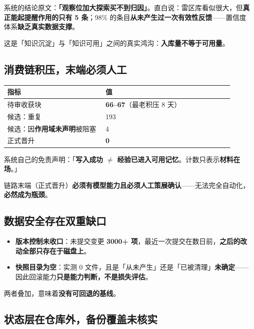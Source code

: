 \documentclass[11pt,a4paper]{ctexart}
\newcommand{\warnbox}[1]{%
  \begin{center}%
  \begin{minipage}{0.94\linewidth}%
  \setlength{\fboxsep}{9pt}%
  \colorbox{QuoteBg}{\parbox{\dimexpr\linewidth-2\fboxsep}{%
    \color{WarnRed}#1}}%
  \end{minipage}%
  \end{center}%
}
\begin{document}
系统的结论原文：\textbf{「观察位加大探索买不到归因」}。直白说：雷区库看似很大，但\textbf{真正能起提醒作用的只有 5 条}；98\% 的条目\textbf{从未产生过一次有效性反馈}——置信度体系\textbf{缺乏真实数据支撑}。

\warnbox{这是「知识沉淀」与「知识可用」之间的真实鸿沟：\textbf{入库量不等于可用量}。}

\subsection{消费链积压，末端必须人工}

\begin{center}
\begin{tabular}{@{}p{0.40\linewidth}p{0.52\linewidth}@{}}
\toprule
\textbf{指标} & \textbf{值} \\
\midrule
待审收获块 & \textbf{66--67}（最老积压 8 天） \\
候选：重复 & 193 \\
候选：因\textbf{作用域未声明}被阻塞 & 4 \\
正式晋升 & \textbf{0} \\
\bottomrule
\end{tabular}
\end{center}

系统自己的免责声明：「\textbf{写入成功 $\neq$ 经验已进入可用记忆}。计数只表示\textbf{材料在场}。」

链路末端（正式晋升）\textbf{必须有模型能力且必须人工策展确认}——无法完全自动化，\textbf{必然成为瓶颈}。

\subsection{数据安全存在双重缺口}

\begin{itemize}
  \item \textbf{版本控制未收口}：未提交变更 \textbf{3000+ 项}，最近一次提交在数日前，\textbf{之后的改动全部只存在于磁盘上}。
  \item \textbf{快照目录为空}：实测 0 文件，且是「从未产生」还是「已被清理」\textbf{未确定}——因此回滚能力\textbf{只是能力判断，不是损失评估}。
\end{itemize}

两者叠加，意味着\textbf{没有可回退的基线}。

\subsection{状态层在仓库外，备份覆盖未核实}
\end{document}
